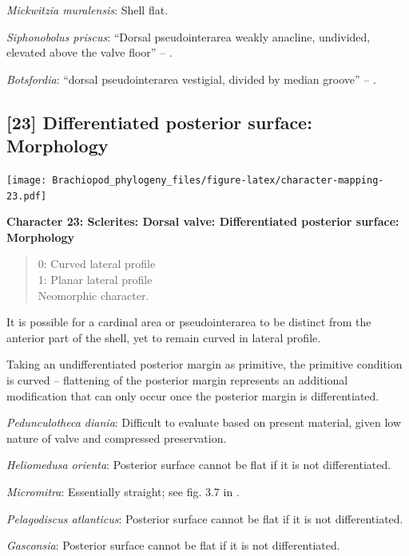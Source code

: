 \documentclass[openany]{book}
\theoremstyle{definition}
\theoremstyle{definition}
\theoremstyle{definition}
\theoremstyle{remark}
\begin{document}
\emph{Mickwitzia muralensis}: Shell flat.

\emph{Siphonobolus priscus}: ``Dorsal pseudointerarea weakly anacline,
undivided, elevated above the valve floor'' --
\citet{Popov2009Earlyontogeny}.

\emph{Botsfordia}: ``dorsal pseudointerarea vestigial, divided by median
groove'' -- \citet{Williams2000BrachiopodaLinguliformea}.

\hypertarget{differentiated-posterior-surface-morphology}{%
\subsection*{{[}23{]} Differentiated posterior surface:
Morphology}\label{differentiated-posterior-surface-morphology}}

\texttt{[image: Brachiopod\_phylogeny\_files/figure-latex/character-mapping-23.pdf]}

\textbf{Character 23: Sclerites: Dorsal valve: Differentiated posterior
surface: Morphology}

\begin{quote}
0: Curved lateral profile\\
1: Planar lateral profile\\
Neomorphic character.
\end{quote}

It is possible for a cardinal area or pseudointerarea to be distinct
from the anterior part of the shell, yet to remain curved in lateral
profile.

Taking an undifferentiated posterior margin as primitive, the primitive
condition is curved -- flattening of the posterior margin represents an
additional modification that can only occur once the posterior margin is
differentiated.

\emph{Pedunculotheca diania}: Difficult to evaluate based on present
material, given low nature of valve and compressed preservation.

\emph{Heliomedusa orienta}: Posterior surface cannot be flat if it is
not differentiated.

\emph{Micromitra}: Essentially straight; see fig. 3.7 in
\citet{Ushatinskaya2016Protegulumand}.

\emph{Pelagodiscus atlanticus}: Posterior surface cannot be flat if it
is not differentiated.

\emph{Gasconsia}: Posterior surface cannot be flat if it is not
differentiated.
\end{document}
